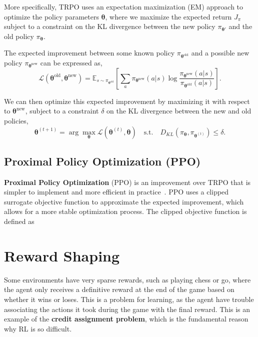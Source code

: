 \documentclass[12pt]{report}
\theoremstyle{definition}
\theoremstyle{remark}
\begin{document}
More specifically, TRPO uses an expectation maximization (EM) approach to optimize the policy parameters $\boldsymbol{\theta}$, where we maximize the expected return $J_\pi$ subject to a constraint on the KL divergence between the new policy $\pi_{\boldsymbol{\theta}'}$ and the old policy $\pi_{\boldsymbol{\theta}}$.

The expected improvement between some known policy $\pi_{\boldsymbol{\theta}^{\text{old}}}$ and a possible new policy $\pi_{\boldsymbol{\theta}^{\text{new}}}$ can be expressed as,
\begin{equation}
    \mathcal{L}(\boldsymbol{\theta}^\text{old}, \boldsymbol{\theta}^\text{new})= \mathbb{E}_{s\sim\pi_{\boldsymbol{\theta}^\text{old}}}\left[\sum_a \pi_{\boldsymbol{\theta}^\text{new}}(a | s) \log \frac{\pi_{\boldsymbol{\theta}^\text{new}}(a|s)}{\pi_{\boldsymbol{\theta}^\text{old}}(a|s)}\right].
\end{equation}

We can then optimize this expected improvement by maximizing it with respect to $\boldsymbol{\theta}^\text{new}$, subject to a constraint $\delta$ on the KL divergence between the new and old policies,
\begin{equation}
    \boldsymbol{\theta}^{(t+1)} = \arg\max_{\boldsymbol{\theta}} \mathcal{L}(\boldsymbol{\theta}^{(t)}, \boldsymbol{\theta}) \quad \text{s.t.} \quad D_{KL}\left(\pi_{\boldsymbol{\theta}}, \pi_{\boldsymbol{\theta}^{(t)}}\right) \leq \delta.
\end{equation}

\subsection{Proximal Policy Optimization (PPO)}
\textbf{Proximal Policy Optimization} (PPO) is an improvement over TRPO that is simpler to implement and more efficient in practice~\cite{schulman_proximal_2017}. PPO uses a clipped surrogate objective function to approximate the expected improvement, which allows for a more stable optimization process. The clipped objective function is defined as

\section{Reward Shaping}
Some environments have very sparse rewards, such as playing chess or go, where the agent only receives a definitive reward at the end of the game based on whether it wins or loses. This is a problem for learning, as the agent have trouble associating the actions it took during the game with the final reward. This is an example of the \textbf{credit assignment problem}, which is the fundamental reason why RL is so difficult.
\end{document}
